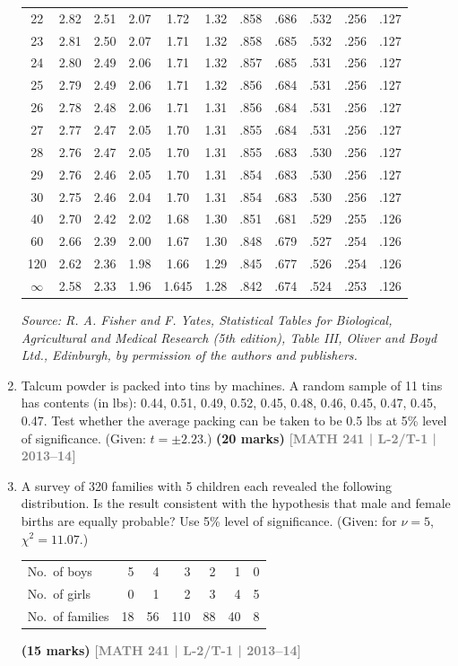 \documentclass[12pt,a4paper]{article}
\newcommand{\yr}[1]{\hfill\textcolor{gray}{\small\textbf{[#1]}}}
\newcommand{\mk}[1]{\textcolor{orange!70!black}{\small\textbf{(#1 marks)}}}
\begin{document}
\begin{enumerate}
\begin{center}
\begin{longtable}{c | ccccc | ccccc}
22 & 2.82 & 2.51 & 2.07 & 1.72 & 1.32 & .858 & .686 & .532 & .256 & .127 \\
23 & 2.81 & 2.50 & 2.07 & 1.71 & 1.32 & .858 & .685 & .532 & .256 & .127 \\
24 & 2.80 & 2.49 & 2.06 & 1.71 & 1.32 & .857 & .685 & .531 & .256 & .127 \\
25 & 2.79 & 2.49 & 2.06 & 1.71 & 1.32 & .856 & .684 & .531 & .256 & .127 \\
26 & 2.78 & 2.48 & 2.06 & 1.71 & 1.31 & .856 & .684 & .531 & .256 & .127 \\
27 & 2.77 & 2.47 & 2.05 & 1.70 & 1.31 & .855 & .684 & .531 & .256 & .127 \\
28 & 2.76 & 2.47 & 2.05 & 1.70 & 1.31 & .855 & .683 & .530 & .256 & .127 \\
29 & 2.76 & 2.46 & 2.05 & 1.70 & 1.31 & .854 & .683 & .530 & .256 & .127 \\
30 & 2.75 & 2.46 & 2.04 & 1.70 & 1.31 & .854 & .683 & .530 & .256 & .127 \\
40 & 2.70 & 2.42 & 2.02 & 1.68 & 1.30 & .851 & .681 & .529 & .255 & .126 \\
60 & 2.66 & 2.39 & 2.00 & 1.67 & 1.30 & .848 & .679 & .527 & .254 & .126 \\
120 & 2.62 & 2.36 & 1.98 & 1.66 & 1.29 & .845 & .677 & .526 & .254 & .126 \\
$\infty$ & 2.58 & 2.33 & 1.96 & 1.645 & 1.28 & .842 & .674 & .524 & .253 & .126 \\
\end{longtable}

\vspace{0.5cm}
\small{\textit{Source: R. A. Fisher and F. Yates, Statistical Tables for Biological, Agricultural and Medical Research (5th edition), Table III, Oliver and Boyd Ltd., Edinburgh, by permission of the authors and publishers.}}
\end{center}


\item Talcum powder is packed into tins by machines. A random sample of 11 tins has contents (in lbs): 0.44, 0.51, 0.49, 0.52, 0.45, 0.48, 0.46, 0.45, 0.47, 0.45, 0.47. Test whether the average packing can be taken to be 0.5 lbs at 5\% level of significance. (Given: $t=\pm2.23$.)
\mk{20} \yr{MATH 241 | L-2/T-1 | 2013--14}

\item A survey of 320 families with 5 children each revealed the following distribution. Is the result consistent with the hypothesis that male and female births are equally probable? Use 5\% level of significance. (Given: for $\nu=5$, $\chi^{2}=11.07$.)
\begin{center}
\begin{tabular}{lrrrrrr}
\toprule
No.\ of boys  & 5  & 4  & 3   & 2  & 1  & 0 \\
No.\ of girls & 0  & 1  & 2   & 3  & 4  & 5 \\
\midrule
No.\ of families & 18 & 56 & 110 & 88 & 40 & 8 \\
\bottomrule
\end{tabular}
\end{center}
\mk{15} \yr{MATH 241 | L-2/T-1 | 2013--14}


\end{enumerate}
\end{document}
